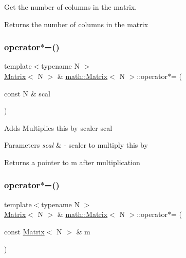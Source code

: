 Get the number of columns in the matrix. \begin{DoxyReturn}{Returns}
the number of columns in the matrix 
\end{DoxyReturn}
\mbox{\label{classmath_1_1Matrix_a1704c2b9fd200a6854b6793524a15700}} 
\subsubsection{\texorpdfstring{operator$\ast$=()}{operator*=()}\hspace{0.1cm}{\footnotesize\ttfamily [1/2]}}
{\footnotesize\ttfamily template$<$typename N $>$ \\
\hyperlink{classmath_1_1Matrix}{Matrix}$<$ N $>$ \& \hyperlink{classmath_1_1Matrix}{math\+::\+Matrix}$<$ N $>$\+::operator$\ast$= (\begin{DoxyParamCaption}\item[{const N \&}]{scal }\end{DoxyParamCaption})}

Adds Multiplies {\ttfamily this} by scaler {\ttfamily scal} 
\begin{DoxyParams}{Parameters}
{\em scal} & -\/ scaler to multiply {\ttfamily this} by \\
\hline
\end{DoxyParams}
\begin{DoxyReturn}{Returns}
a pointer to {\ttfamily m} after multiplication 
\end{DoxyReturn}
\mbox{\label{classmath_1_1Matrix_a4dbf1e0c5f42ce314ea2510a025b7e2a}} 
\subsubsection{\texorpdfstring{operator$\ast$=()}{operator*=()}\hspace{0.1cm}{\footnotesize\ttfamily [2/2]}}
{\footnotesize\ttfamily template$<$typename N $>$ \\
\hyperlink{classmath_1_1Matrix}{Matrix}$<$ N $>$ \& \hyperlink{classmath_1_1Matrix}{math\+::\+Matrix}$<$ N $>$\+::operator$\ast$= (\begin{DoxyParamCaption}\item[{const \hyperlink{classmath_1_1Matrix}{Matrix}$<$ N $>$ \&}]{m }\end{DoxyParamCaption})}

